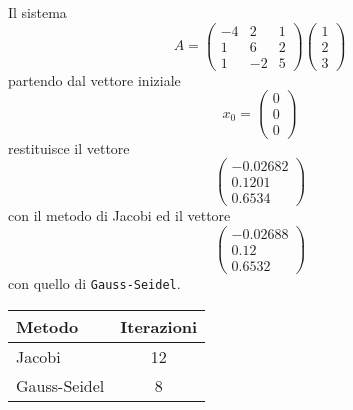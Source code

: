 

Il sistema 
\[
A = \left(\begin{array}{ccc} -4 & 2 & 1\\ 1 & 6 & 2\\ 1 & -2 & 5 \end{array}\right) \left(\begin{array}{c} 1\\ 2\\ 3 \end{array}\right)
\]
partendo dal vettore iniziale 
\[
x_0 = \left(\begin{array}{c} 0\\ 0\\ 0 \end{array}\right)
\]
restituisce il vettore 
\[
\left(\begin{array}{c} -0.02682\\ 0.1201\\ 0.6534 \end{array}\right)
\] 
con il metodo di Jacobi ed il vettore 
\[
\left(\begin{array}{c} -0.02688\\ 0.12\\ 0.6532 \end{array}\right)
\]
con quello di \texttt{Gauss-Seidel}.

\begin{tabular}{l c}
\hline
Metodo & Iterazioni\\
\hline
Jacobi & 12 \\
Gauss-Seidel & 8\\
\hline
\end{tabular}